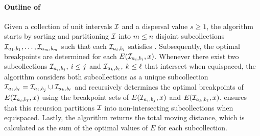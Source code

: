 \paragraph*{Outline of } 
Given a collection of unit intervals $\mathcal{I}$ and a dispersal value $s\ge1$, the algorithm starts by sorting and partitioning $\mathcal{I}$ into $m\le n$ disjoint subcollections $\mathcal{I}_{a_1,b_1},\ldots,\mathcal{I}_{a_{m},b_{m}}$ such that each $\mathcal{I}_{a_{i},b_{i}}$ satisfies .
Subsequently, the optimal breakpoints are determined for each $E(\mathcal{I}_{a_{i},b_{i}},x)$.
Whenever there exist two subcollections $\mathcal{I}_{a_{i},b_{j}},\:i\le j$ and $\mathcal{I}_{a_{k},b_{\ell}},\:k\le \ell$ that intersect when equispaced, the algorithm considers both subcollections as a unique subcollection $\mathcal{I}_{a_i,b_{\ell}} = \mathcal{I}_{a_i,b_{j}} \cup \mathcal{I}_{a_k,b_{\ell}}$ and recursively determines the optimal breakpoints of $E(\mathcal{I}_{a_i,b_{\ell}},x)$ using the breakpoint sets of $E(\mathcal{I}_{a_i,b_{j}},x)$ and $E(\mathcal{I}_{a_k,b_{\ell}},x)$.
%
%
 ensures that this recursion partitions $\mathcal{I}$ into non-intersecting subcollections when equispaced.
%
Lastly, the algorithm returns the total moving distance, which is calculated as the sum of the optimal values of $E$ for each subcollection.


